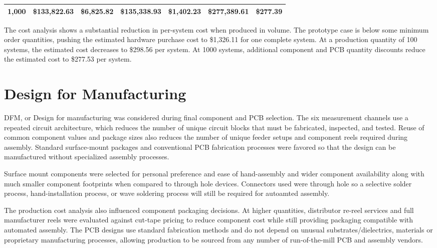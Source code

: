 \begin{weekthreechange}
\begin{table}[H]
{\begin{tabular}{rrrrrrr}
                1,000
                & \$133,822.63
                & \$6,825.82
                & \$135,338.93
                & \$1,402.23
                & \$277,389.61
                & \$277.39 \\
                \bottomrule
            \end{tabular}%
        }
    \end{table}

    The cost analysis shows a substantial reduction in per-system cost when produced in volume. The prototype case is below some minimum order quantities, pushing the estimated hardware purchase cost to \$1,326.11 for one complete system. At a production quantity of 100 systems, the estimated cost decreases to \$298.56 per system. At 1000 systems, additional component and PCB quantity discounts reduce the
    estimated cost to \$277.53 per system.

    \section{Design for Manufacturing}

    DFM, or Design for manufacturing was considered during final component and PCB selection. The six measurement channels use a repeated circuit architecture, which reduces the number of unique circuit blocks that must be fabricated, inspected, and tested. Reuse of common component values and package sizes also reduces the number of unique feeder setups and component reels required during assembly. Standard surface-mount packages and conventional PCB fabrication processes were favored so that the design can be manufactured without specialized assembly processes.

    Surface mount components were selected for personal preference and ease of hand-assembly and wider component availability along with much smaller component footprints when compared to through hole devices. Connectors used were through hole so a selective solder process, hand-installation process, or wave soldering process will still be required for autoamted assembly.

    The production cost analysis also influenced component packaging decisions. At higher quantities, distributor re-reel services and full manufacturer reels were evaluated against cut-tape pricing to reduce component cost while still providing packaging compatible with automated assembly. The PCB designs use standard fabrication methods and do not depend on unusual substrates/dielectrics, materials or proprietary manufacturing processes, allowing production to be sourced from
    any number of run-of-the-mill PCB and assembly vendors.


\end{weekthreechange}
